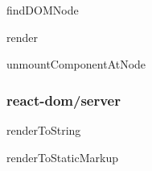 \begin{DoxyItemize}
\item {\ttfamily find\+D\+O\+M\+Node}
\item {\ttfamily render}
\item {\ttfamily unmount\+Component\+At\+Node}
\end{DoxyItemize}

\subsubsection*{{\ttfamily react-\/dom/server}}


\begin{DoxyItemize}
\item {\ttfamily render\+To\+String}
\item {\ttfamily render\+To\+Static\+Markup} 
\end{DoxyItemize}